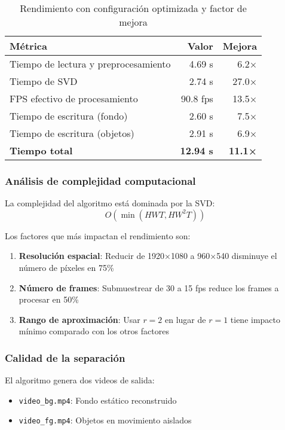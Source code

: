 \documentclass[12pt]{article}
\begin{document}
\begin{table}[h]
\centering
\begin{tabular}{|l|r|r|}
\hline
\textbf{Métrica} & \textbf{Valor} & \textbf{Mejora} \\
\hline
Tiempo de lectura y preprocesamiento & 4.69 s & 6.2× \\
Tiempo de SVD & 2.74 s & 27.0× \\
FPS efectivo de procesamiento & 90.8 fps & 13.5× \\
Tiempo de escritura (fondo) & 2.60 s & 7.5× \\
Tiempo de escritura (objetos) & 2.91 s & 6.9× \\
\textbf{Tiempo total} & \textbf{12.94 s} & \textbf{11.1×} \\
\hline
\end{tabular}
\caption{Rendimiento con configuración optimizada y factor de mejora}
\label{tab:exp2}
\end{table}

\subsubsection{Análisis de complejidad computacional}

La complejidad del algoritmo está dominada por la SVD:
\[
O(\min(HWT, HW^2T))
\]

Los factores que más impactan el rendimiento son:
\begin{enumerate}
    \item \textbf{Resolución espacial}: Reducir de 1920×1080 a 960×540 disminuye el número de píxeles en 75\%
    \item \textbf{Número de frames}: Submuestrear de 30 a 15 fps reduce los frames a procesar en 50\%
    \item \textbf{Rango de aproximación}: Usar $r=2$ en lugar de $r=1$ tiene impacto mínimo comparado con los otros factores
\end{enumerate}

\subsubsection{Calidad de la separación}

El algoritmo genera dos videos de salida:

\begin{itemize}
    \item \texttt{video\_bg.mp4}: Fondo estático reconstruido
    \item \texttt{video\_fg.mp4}: Objetos en movimiento aislados
\end{itemize}
\end{document}

